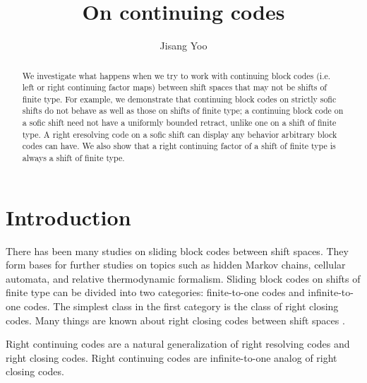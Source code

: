 \documentclass[a4paper]{amsart}
\theoremstyle{definition}
\numberwithin{equation}{section}
\numberwithin{figure}{section}
\theoremstyle{definition}
\theoremstyle{remark}
\begin{document}
\title{On continuing codes}
\author{Jisang Yoo}
\address{Ajou University, Suwon, South Korea}

\begin{abstract}
We investigate what happens when we try to work with continuing block codes (i.e. left or right continuing factor maps) between shift spaces that may not be shifts of finite type. For example, we demonstrate that continuing block codes on strictly sofic shifts do not behave as well as those on shifts of finite type; a continuing block code on a sofic shift need not have a uniformly bounded retract, unlike one on a shift of finite type. A right eresolving code on a sofic shift can display any behavior arbitrary block codes can have. We also show that a right continuing factor of a shift of finite type is always a shift of finite type.
\end{abstract}

\maketitle
\tableofcontents

\section{Introduction}

There has been many studies on sliding block codes between shift spaces. They form bases for further studies on topics such as hidden Markov chains, cellular automata, and relative thermodynamic formalism. Sliding block codes on shifts of finite type can be divided into two categories: finite-to-one codes and infinite-to-one codes. The simplest class in the first category is the class of right closing codes. Many things are known about right closing codes between shift spaces \cite{BMT-ResolvingDimensionGroup,LM}.

Right continuing codes are a natural generalization of right resolving codes and right closing codes. Right continuing codes are infinite-to-one analog of right closing codes.
\end{document}
